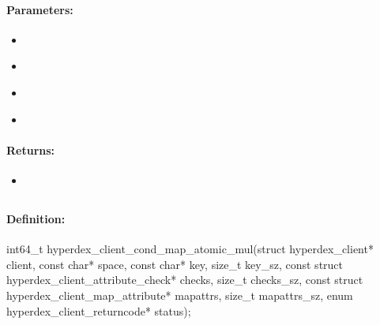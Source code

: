 \paragraph{Parameters:}
\begin{itemize}[noitemsep]
\item {}\\

\item {}\\

\item {}\\

\item {}\\

\end{itemize}

\paragraph{Returns:}
\begin{itemize}[noitemsep]
\item {}\\

\end{itemize}

\pagebreak
\subsection{}
\label{api:c:cond_map_atomic_mul}


\paragraph{Definition:}
\begin{ccode}
int64_t hyperdex_client_cond_map_atomic_mul(struct hyperdex_client* client,
        const char* space,
        const char* key, size_t key_sz,
        const struct hyperdex_client_attribute_check* checks, size_t checks_sz,
        const struct hyperdex_client_map_attribute* mapattrs, size_t mapattrs_sz,
        enum hyperdex_client_returncode* status);
\end{ccode}

